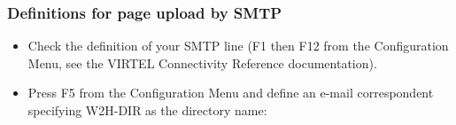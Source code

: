 \documentclass[letterpaper,10pt,english]{sphinxmanual}
\begin{document}
\subsubsection{Definitions for page upload by SMTP}
\label{\detokenize{audit_operations_ and_performance:definitions-for-page-upload-by-smtp}}\label{\detokenize{audit_operations_ and_performance:index-69}}\begin{itemize}
\item {} 
Check the definition of your SMTP line (F1 then F12 from the Configuration Menu, see the VIRTEL Connectivity Reference documentation).

\item {} 
Press F5 from the Configuration Menu and define an e-mail correspondent specifying W2H-DIR as the directory name:

\end{itemize}
\end{document}
